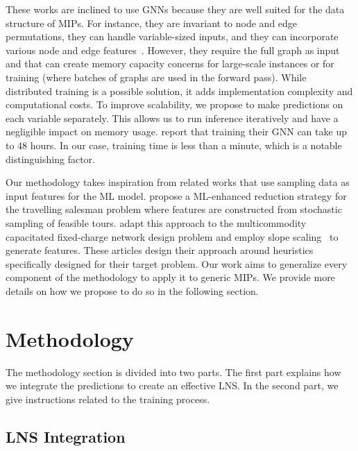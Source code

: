 \documentclass[3p, authoryear, times]{elsarticle}
\begin{document}
These works are inclined to use GNNs because they are well suited for the data structure of MIPs. For instance, they are invariant to node and edge permutations, they can handle variable-sized inputs, and they can incorporate various node and edge features~\citep{peng_graph_2021}. However, they require the full graph as input and that can create memory capacity concerns for large-scale instances or for training (where batches of graphs are used in the forward pass). While distributed training is a possible solution, it adds implementation complexity and computational costs. To improve scalability, we propose to make predictions on each variable separately. This allows us to run inference iteratively and have a negligible impact on memory usage. \cite{sonnerat_learning_2022} report that training their GNN can take up to 48 hours. In our case, training time is less than a minute, which is a notable distinguishing factor. 

Our methodology takes inspiration from related works that use sampling data as input features for the ML model. \cite{sun_generalization_2021} propose a ML-enhanced reduction strategy for the travelling salesman problem where features are constructed from stochastic sampling of feasible tours. \cite{la_rocca_combining_2024_fixed} adapt this approach to the multicommodity capacitated fixed-charge network design problem and employ slope scaling~\citep{crainic_slope_2004} to generate features. These articles design their approach around heuristics specifically designed for their target problem. Our work aims to generalize every component of the methodology to apply it to generic MIPs.  We provide more details on how we propose to do so in the following section. 




\section{Methodology} \label{sec:lns:methodology}
The methodology section is divided into two parts. The first part explains how we integrate the predictions to create an effective LNS. In the second part, we give instructions related to the training process. 

\subsection{LNS Integration}
\end{document}
